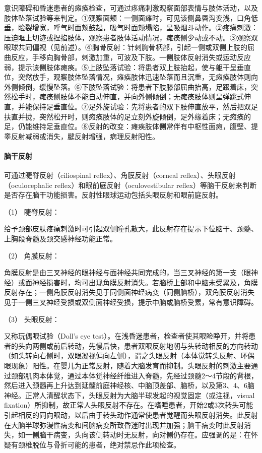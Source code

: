 意识障碍和昏迷患者的瘫痪检查，可通过疼痛刺激观察面部表情与肢体活动，以及肢体坠落试验等来判定。①观察面颊：一侧面瘫时，可见该侧鼻唇沟变浅，口角低垂，睑裂增宽，呼气时面颊鼓起，吸气时面颊塌陷，呈吸烟斗动作。②疼痛刺激：压迫眶上切迹或捏掐肢体，观察患者肢体活动情况，瘫痪侧少动或不动。③观察双眼球共同偏视（见前述）。④胸骨反射：针刺胸骨柄部，引起一侧或双侧上肢的屈曲反应，手移向胸骨部，刺激加重，可波及下肢。一侧肢体反射消失或运动反应弱，提示该侧肢体瘫痪。⑤上肢坠落试验：将患者双上肢抬起，使与躯干呈垂直位，突然放手，观察肢体坠落情况，瘫痪肢体迅速坠落而且沉重，无瘫痪肢体则向外侧倾倒，缓慢坠落。⑥下肢坠落试验：将患者下肢膝部屈曲抬高，足跟着床，突然松手时，瘫痪侧肢体不能自动伸直，并向外侧倾倒；无瘫痪肢体则呈弹跳式伸直，并能保持足垂直位。⑦足外旋试验：先将患者的双下肢伸直放平，然后把双足扶直并拢，突然松开时，则瘫痪肢体的足立刻外旋倾倒，足外缘着床；无瘫痪的足，仍能维持足垂直位。⑧反射的改变：瘫痪肢体侧常伴有中枢性面瘫，腹壁、提睾反射减弱或消失，腱反射增强，病理反射阳性。

\paragraph{脑干反射}

可通过睫脊反射（ciliospinal reflex）、角膜反射（corneal
reflex）、头眼反射（oculocephalic reflex）和眼前庭反射（oculovestibular
reflex）等脑干反射来判断是否存在脑干功能损害。反射性眼球运动包括头眼反射和眼前庭反射。

\hypertarget{text00010.htmlux5cux23CHP1-2-2-1-3-4-1}{}
（1） 睫脊反射：

给予颈部皮肤疼痛刺激时可引起双侧瞳孔散大，此反射存在提示下位脑干、颈髓、上胸段脊髓及颈交感神经功能正常。

\hypertarget{text00010.htmlux5cux23CHP1-2-2-1-3-4-2}{}
（2） 角膜反射：

角膜反射是由三叉神经的眼神经与面神经共同完成的，当三叉神经的第一支（眼神经）或面神经损害时，均可出现角膜反射消失。若脑桥上部和中脑未受累及，角膜反射存在；一侧角膜反射消失见于同侧面神经病变（同侧脑桥），双角膜反射消失见于一侧三叉神经受损或双侧面神经受损，提示中脑或脑桥受累，常有意识障碍。

\hypertarget{text00010.htmlux5cux23CHP1-2-2-1-3-4-3}{}
（3） 头眼反射：

又称玩偶眼试验（Doll's eye
test）。在浅昏迷患者，检查者使其眼睑睁开，并将患者的头向两侧或前后转动，先慢后快，患者双眼反射地朝与头转动相反的方向转动（如头转向右侧时，双眼凝视偏向左侧），谓之头眼反射（本体觉转头反射、环偶眼现象）阳性。在婴儿为正常反射，随着大脑发育而抑制。头眼反射的刺激主要通过颈部肌肉本体觉，通过本体觉神经纤维进入脊髓，先经过颈髓2～4节段的背根，然后进入颈髓再上升达到延髓前庭神经核、中脑顶盖部、脑桥，以及第3、4、6脑神经。正常人清醒状态下，头眼反射为大脑半球发起的视觉固定（或注视，visual
fixation）所抑制，故正常人头眼反射不存在。在嗜睡患者，开始2或3次转头可能引起相反的同向眼动，以后由于转头动作通常使患者觉醒而头眼反射消失。此反射在大脑半球弥漫性病变和间脑病变所致昏迷时出现并加强；脑干病变时此反射消失，如一侧脑干病变，头向该侧转动时无反射，向对侧仍存在。应强调的是：在怀疑有颈椎脱位与骨折可能的患者，绝对禁忌作此项检查。

